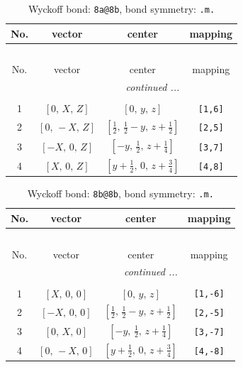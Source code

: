 \documentclass[fleqn,8pt]{jsarticle}
\begin{document}
\begin{longtable}{cccc}
\caption{Wyckoff bond: {\tt 8a@8b}, bond symmetry: {\tt .m.}}
 \\
 \hline \hline
No. & vector & center & mapping \\ \hline \endfirsthead

\multicolumn{3}{l}{\tablename\ \thetable{}} \\
 \hline \hline
No. & vector & center & mapping \\ \hline \endhead

 \hline \hline
\multicolumn{3}{r}{\footnotesize\it continued ...} \\ \endfoot

 \hline \hline
\multicolumn{3}{r}{} \\ \endlastfoot

1 & $\left[ 0,\, X,\, Z \right]$ & $\left[ 0,\, y,\, z \right]$ & {\tt [1,6]} \\ \hline
2 & $\left[ 0,\, - X,\, Z \right]$ & $\left[ \frac{1}{2},\, \frac{1}{2} - y,\, z + \frac{1}{2} \right]$ & {\tt [2,5]} \\ \hline
3 & $\left[ - X,\, 0,\, Z \right]$ & $\left[ - y,\, \frac{1}{2},\, z + \frac{1}{4} \right]$ & {\tt [3,7]} \\ \hline
4 & $\left[ X,\, 0,\, Z \right]$ & $\left[ y + \frac{1}{2},\, 0,\, z + \frac{3}{4} \right]$ & {\tt [4,8]} \\
\end{longtable}
\renewcommand{\arraystretch}{1.2}
\begin{longtable}{cccc}
\caption{Wyckoff bond: {\tt 8b@8b}, bond symmetry: {\tt .m.}}
 \\
 \hline \hline
No. & vector & center & mapping \\ \hline \endfirsthead

\multicolumn{3}{l}{\tablename\ \thetable{}} \\
 \hline \hline
No. & vector & center & mapping \\ \hline \endhead

 \hline \hline
\multicolumn{3}{r}{\footnotesize\it continued ...} \\ \endfoot

 \hline \hline
\multicolumn{3}{r}{} \\ \endlastfoot

1 & $\left[ X,\, 0,\, 0 \right]$ & $\left[ 0,\, y,\, z \right]$ & {\tt [1,-6]} \\ \hline
2 & $\left[ - X,\, 0,\, 0 \right]$ & $\left[ \frac{1}{2},\, \frac{1}{2} - y,\, z + \frac{1}{2} \right]$ & {\tt [2,-5]} \\ \hline
3 & $\left[ 0,\, X,\, 0 \right]$ & $\left[ - y,\, \frac{1}{2},\, z + \frac{1}{4} \right]$ & {\tt [3,-7]} \\ \hline
4 & $\left[ 0,\, - X,\, 0 \right]$ & $\left[ y + \frac{1}{2},\, 0,\, z + \frac{3}{4} \right]$ & {\tt [4,-8]} \\
\end{longtable}
\end{document}
